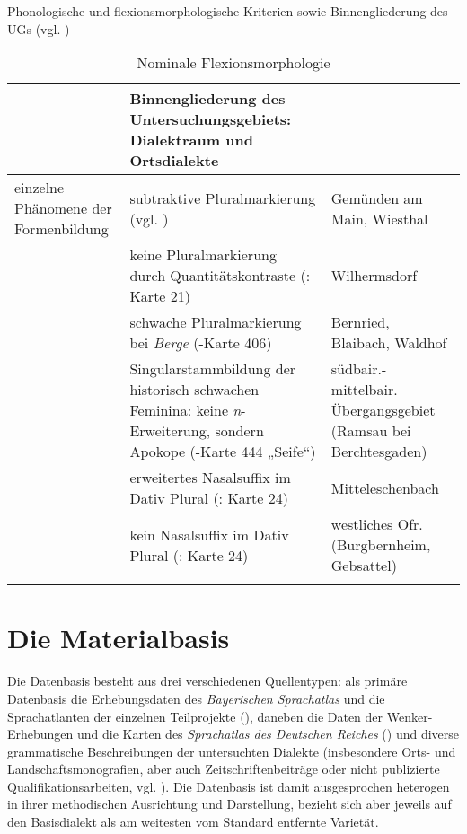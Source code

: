 \begin{table}
\ContinuedFloat
\caption{Phonologische und flexionsmorphologische Kriterien sowie Binnengliederung des UGs (vgl. \citealt[4--5]{Rowley1997})}

\begin{subtable}{\textwidth}
\caption{Nominale Flexionsmorphologie}
\label{tab:12e}
\small
\begin{tabularx}{\textwidth}{>{\raggedright\arraybackslash}p{}QQ}
\lsptoprule

 & Binnengliederung des Untersuchungs\-gebiets: Dialektraum und Ortsdialekte\\
\midrule
einzelne Phänomene der Formenbildung & subtraktive Pluralmarkierung (vgl. \citealt{Köhler1934}) & Gemünden am Main, Wiesthal\\
\tablevspace
& keine Pluralmarkierung durch Quantitätskontraste (\citealt{SMF7}: Karte 21) & Wilhermsdorf\\
\tablevspace
& schwache Pluralmarkierung bei \textit{Berge} (\citealt{WA}-Karte 406) & Bernried, Blaibach, Waldhof\\
\tablevspace
& Singularstammbildung der historisch schwachen Feminina: keine \textit{n}{}-Erweiterung, sondern Apokope (\citealt{WA}-Karte 444 „Seife“) & südbair.-mittelbair. Übergangsgebiet (Ramsau bei Berchtesgaden)\\
\tablevspace
& erweitertes Nasalsuffix im Dativ Plural (\citealt{SMF7}: Karte 24) & Mitteleschenbach\\
\tablevspace
& kein Nasalsuffix im Dativ Plural (\citealt{SMF7}: Karte 24) & westliches Ofr. (Burgbernheim, Gebsattel)\\
\lspbottomrule
\end{tabularx}
\end{subtable}
\end{table}

\clearpage
\section{Die Materialbasis}\label{sec:6.2}
\begin{sloppypar}
Die Datenbasis besteht aus drei verschiedenen Quellentypen: als primäre Datenbasis die Erhebungsdaten des \textit{Bayerischen Sprachatlas} und die Sprachatlanten der einzelnen Teilprojekte (), daneben die Daten der Wenker-Erhebungen und die Karten des \textit{Sprachatlas des Deutschen Reiches} () und diverse grammatische Beschreibungen der untersuchten Dialekte (insbesondere Orts- und Landschaftsmonografien, aber auch Zeitschriftenbeiträge oder nicht publizierte Qualifikationsarbeiten, vgl. ). Die Datenbasis ist damit ausgesprochen heterogen in ihrer methodischen Ausrichtung und Darstellung, bezieht sich aber jeweils auf den Basisdialekt als am weitesten vom Standard entfernte Varietät.
\end{sloppypar}

